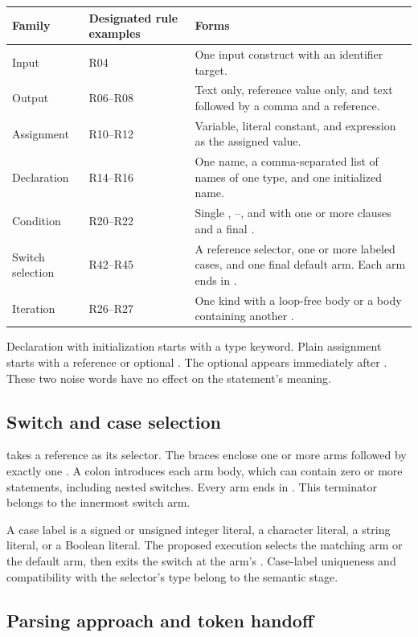 \begin{tabularx}{\linewidth}{@{}L{29mm}L{47mm}Y@{}}
\toprule
\textbf{Family} & \textbf{Designated rule examples} & \textbf{Forms} \\
\midrule
Input & R04 & One input construct with an identifier target. \\
Output & R06--R08 & Text only, reference value only, and text followed by a comma and a reference. \\
Assignment & R10--R12 & Variable, literal constant, and expression as the assigned value. \\
Declaration & R14--R16 & One name, a comma-separated list of names of one type, and one initialized name. \\
Condition & R20--R22 & Single , --, and  with one or more  clauses and a final . \\
Switch selection & R42--R45 & A reference selector, one or more labeled cases, and one final default arm. Each arm ends in . \\
Iteration & R26--R27 & One  kind with a loop-free body or a body containing another . \\
\bottomrule
\end{tabularx}

Declaration with initialization starts with a type keyword. Plain assignment starts with a reference or optional . The optional  appears immediately after . These two noise words have no effect on the statement's meaning.

\subsection{Switch and case selection}
 takes a reference as its selector. The braces enclose one or more  arms followed by exactly one . A colon introduces each arm body, which can contain zero or more statements, including nested switches. Every arm ends in . This terminator belongs to the innermost switch arm.

A case label is a signed or unsigned integer literal, a character literal, a string literal, or a Boolean literal. The proposed execution selects the matching arm or the default arm, then exits the switch at the arm's . Case-label uniqueness and compatibility with the selector's type belong to the semantic stage.

\subsection{Parsing approach and token handoff}

